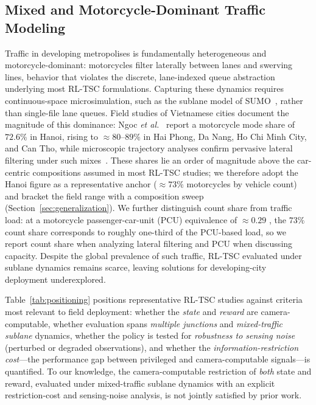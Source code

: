\subsection{Mixed and Motorcycle-Dominant Traffic Modeling}
Traffic in developing metropolises is fundamentally heterogeneous and
motorcycle-dominant: motorcycles filter laterally between lanes and swerving
lines, behavior that violates the discrete, lane-indexed queue abstraction
underlying most RL-TSC formulations. Capturing these dynamics requires
continuous-space microsimulation, such as the sublane model of
SUMO~\cite{lopez2018_sumo}, rather than single-file lane queues. Field studies of
Vietnamese cities document the magnitude of this dominance: Ngoc \emph{et al.}~\cite{ngoc2021_fivecities}
report a motorcycle mode share of $72.6\%$ in Hanoi,
rising to $\approx 80$--$89\%$ in Hai Phong, Da Nang, Ho Chi Minh City, and Can Tho,
while microscopic trajectory analyses confirm pervasive lateral filtering under
such mixes~\cite{vn_roundabout}. These shares lie an order of magnitude above
the car-centric compositions assumed in most RL-TSC studies; we therefore adopt
the Hanoi figure as a representative anchor ($\approx 73\%$ motorcycles by
vehicle count) and bracket the field range with a composition sweep
(Section~\ref{sec:generalization}). We further distinguish count share from traffic load: at a
motorcycle passenger-car-unit (PCU) equivalence of $\approx 0.29$
\cite{cao_sano_hanoi}, the $73\%$ count share corresponds to roughly one-third
of the PCU-based load, so we report count share when analyzing lateral filtering
and PCU when discussing capacity. Despite the global prevalence of such traffic,
RL-TSC evaluated under sublane dynamics remains scarce, leaving solutions for
developing-city deployment underexplored.

Table~\ref{tab:positioning} positions representative RL-TSC studies against
criteria most relevant to field deployment: whether the \emph{state} and
\emph{reward} are camera-computable, whether evaluation spans \emph{multiple
junctions} and \emph{mixed-traffic sublane} dynamics, whether the policy is
tested for \emph{robustness to sensing noise} (perturbed or degraded
observations), and whether the \emph{information-restriction cost}---the
performance gap between privileged and camera-computable signals---is quantified. To our knowledge, the camera-computable restriction of \emph{both} state and reward, evaluated under mixed-traffic sublane dynamics with an explicit restriction-cost and sensing-noise analysis, is not jointly satisfied by prior work.

